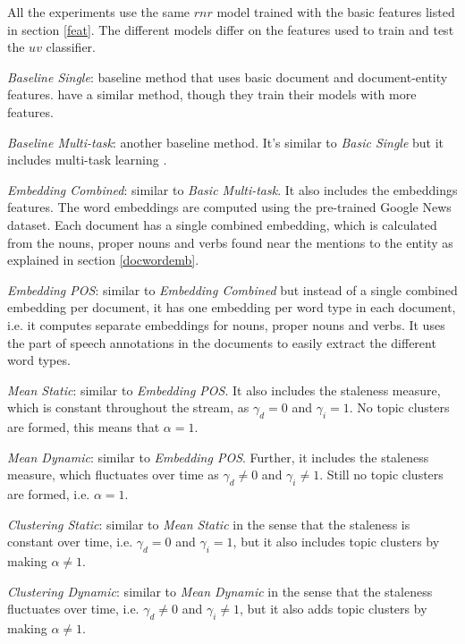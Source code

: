 \documentclass{article}
\begin{document}
All the experiments use the same $rnr$ model trained with the basic features listed in section \ref{feat}. 
The different models differ on the features used to train and test the $uv$ classifier.

\begin{itemize*}
  \item {\textit{Baseline Single}}: baseline method that uses basic document and document-entity features. \citet{jingang13, bellogin13} have a similar method, though they train their models with more features.
  \item {\textit{Baseline Multi-task}}: another baseline method. It's similar to {\textit{Basic Single}} but it includes multi-task learning \cite{Caruana93multitasklearning}.
  \item {\textit{Embedding Combined}}: similar to {\textit{Basic Multi-task}}. It also includes the embeddings features. The word embeddings are computed using the pre-trained Google News dataset. Each document has a single combined embedding, which is calculated from the nouns, proper nouns and verbs found near the mentions to the entity as explained in section \ref{docwordemb}.
  \item {\textit{Embedding POS}}: similar to {\textit{Embedding Combined}} but instead of a single combined embedding per document, it has one embedding per word type in each document, i.e. it computes separate embeddings for nouns, proper nouns and verbs. It uses the part of speech annotations in the documents to easily extract the different word types.
  \item {\textit{Mean Static}}: similar to {\textit{Embedding POS}}. It also includes the staleness measure, which is constant throughout the stream, as $\gamma_d = 0$ and $\gamma_i = 1$. No topic clusters are formed, this means that $\alpha = 1$.
  \item {\textit{Mean Dynamic}}: similar to {\textit{Embedding POS}}. Further, it includes the staleness measure, which fluctuates over time as $\gamma_d \neq 0$ and $\gamma_i \neq 1$. Still no topic clusters are formed, i.e. $\alpha = 1$.
  \item {\textit{Clustering Static}}: similar to {\textit{Mean Static}} in the sense that the staleness is constant over time, i.e. $\gamma_d = 0$ and $\gamma_i = 1$, but it also includes topic clusters by making $\alpha \neq 1$.
  \item {\textit{Clustering Dynamic}}: similar to {\textit{Mean Dynamic}} in the sense that the staleness fluctuates over time, i.e. $\gamma_d \neq 0$ and $\gamma_i \neq 1$, but it also adds topic clusters by making $\alpha \neq 1$.
\end{itemize*}
\end{document}

